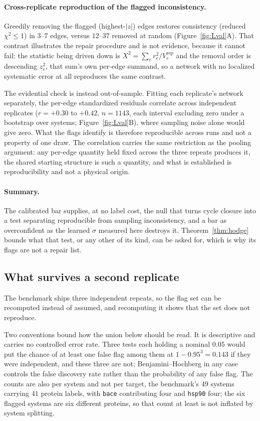 \paragraph{Cross-replicate reproduction of the flagged inconsistency.} Greedily
removing the flagged (highest-$|z|$) edges restores consistency (reduced $\chi^2\le1$) in $3$--$7$
edges, versus $12$--$37$ removed at random (Figure~\ref{fig:Lval}A). That contrast illustrates the
repair procedure and is not evidence, because it cannot fail: the statistic being driven down is
$X^2=\sum_e r_e^2/V_e^{\mathrm{rep}}$ and the removal order is descending $z_e^2$, that sum's own
per-edge summand, so a network with no localized systematic error at all reproduces the same
contrast.

The evidential check is instead out-of-sample. Fitting each replicate's network separately, the
per-edge standardized residuals correlate across independent replicates ($r=+0.30$ to $+0.42$,
$n=1143$, each interval excluding zero under a bootstrap over systems; Figure~\ref{fig:Lval}B),
where sampling noise alone would give zero. What the flags identify is therefore reproducible
across runs and not a property of one draw. The correlation carries the same restriction as the
pooling argument: any per-edge quantity held fixed across the three repeats produces it, the shared
starting structure is such a quantity, and what is established is reproducibility and not a
physical origin.

\paragraph{Summary.} The calibrated bar supplies, at no label cost, the null that turns cycle
closure into a test separating reproducible from sampling inconsistency, and a bar as overconfident
as the learned $\sigma$ measured here destroys it. Theorem~\ref{thm:hodge} bounds what that test, or any
other of its kind, can be asked for, which is why its flags are not a repair list.

\subsection{What survives a second replicate}\label{sec:stability}
The benchmark ships three independent repeats, so the flag set can be recomputed instead of
assumed, and recomputing it shows that the set does not reproduce.

Two conventions bound how the union below should be read. It is descriptive and carries no
controlled error rate. Three tests each holding a nominal $0.05$ would put the chance of at least
one false flag among them at $1-0.95^3=0.143$ if they were independent, and these three are not;
Benjamini--Hochberg in any case controls the false discovery rate rather than the probability of
any false flag. The counts are also per system and not per target, the benchmark's $49$ systems carrying $41$
protein labels, with \texttt{bace} contributing four and \texttt{hsp90} four; the six flagged
systems are six different proteins, so that count at least is not inflated by system splitting.

